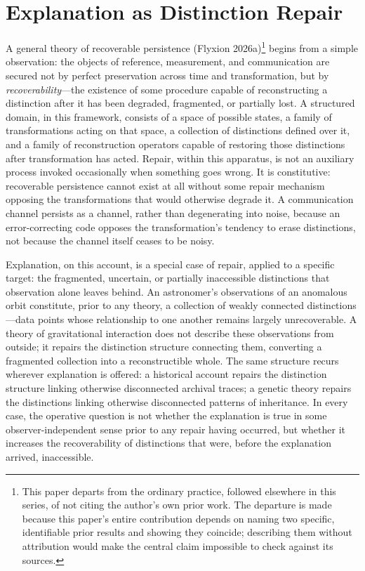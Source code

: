 \documentclass[11pt]{article}
\theoremstyle{plain}
\begin{document}
\section{Explanation as Distinction Repair}
\label{sec:distinction-repair}

A general theory of recoverable persistence (Flyxion 2026a)\footnote{This paper departs from the ordinary practice, followed elsewhere in this series, of not citing the author's own prior work. The departure is made because this paper's entire contribution depends on naming two specific, identifiable prior results and showing they coincide; describing them without attribution would make the central claim impossible to check against its sources.} begins from a simple observation: the objects of reference, measurement, and communication are secured not by perfect preservation across time and transformation, but by \emph{recoverability}---the existence of some procedure capable of reconstructing a distinction after it has been degraded, fragmented, or partially lost. A structured domain, in this framework, consists of a space of possible states, a family of transformations acting on that space, a collection of distinctions defined over it, and a family of reconstruction operators capable of restoring those distinctions after transformation has acted. Repair, within this apparatus, is not an auxiliary process invoked occasionally when something goes wrong. It is constitutive: recoverable persistence cannot exist at all without some repair mechanism opposing the transformations that would otherwise degrade it. A communication channel persists as a channel, rather than degenerating into noise, because an error-correcting code opposes the transformation's tendency to erase distinctions, not because the channel itself ceases to be noisy.

Explanation, on this account, is a special case of repair, applied to a specific target: the fragmented, uncertain, or partially inaccessible distinctions that observation alone leaves behind. An astronomer's observations of an anomalous orbit constitute, prior to any theory, a collection of weakly connected distinctions---data points whose relationship to one another remains largely unrecoverable. A theory of gravitational interaction does not describe these observations from outside; it repairs the distinction structure connecting them, converting a fragmented collection into a reconstructible whole. The same structure recurs wherever explanation is offered: a historical account repairs the distinction structure linking otherwise disconnected archival traces; a genetic theory repairs the distinctions linking otherwise disconnected patterns of inheritance. In every case, the operative question is not whether the explanation is true in some observer-independent sense prior to any repair having occurred, but whether it increases the recoverability of distinctions that were, before the explanation arrived, inaccessible.
\end{document}
